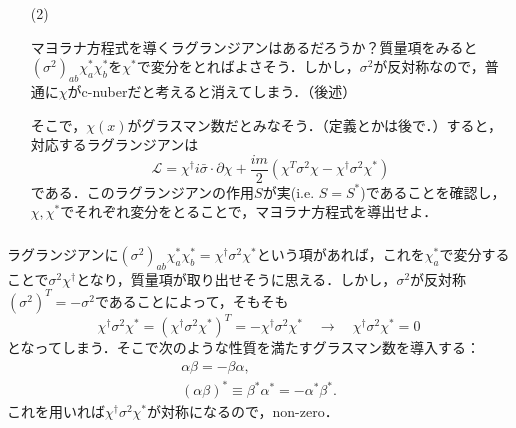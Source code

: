 \documentclass[pdflatex,unicode,ja=standard,12pt]{beamer}
\begin{document}
\begin{frame}

  \frametitle{\subsecname}

  \begin{itemize}

    \item [(2)]

    マヨラナ方程式を導くラグランジアンはあるだろうか？質量項をみると$(\sigma^2)_{ab}\chi^{*}_{a}\chi^{*}_{b}$を$\chi^{*}$で変分をとればよさそう．しかし，$\sigma^2$が反対称なので，普通に$\chi$がc-nuberだと考えると消えてしまう．（後述）

    \vspace{5pt}

    そこで，$\chi(x)$がグラスマン数だとみなそう．（定義とかは後で．）すると，対応するラグランジアンは
    \begin{equation}
      \mathcal{L}
      =
      \chi^{\dag}i\bar{\sigma}\cdot\partial\chi
      +
      \frac{im}{2}
      (  
        \chi^{T}\sigma^2\chi
        -
        \chi^{\dag}\sigma^2\chi^{*}
      )
      \label{majorana_lagrangian}
    \end{equation}
    である．このラグランジアンの作用$S$が実(i.e. $S=S^{*}$)であることを確認し，$\chi,\chi^{*}$でそれぞれ変分をとることで，マヨラナ方程式を導出せよ．
 
  \end{itemize}

\end{frame}

\begin{frame}
  
  \frametitle{\subsecname}

  ラグランジアンに$(\sigma^2)_{ab}\chi^{*}_a\chi^{*}_b=\chi^{\dag}\sigma^{2}\chi^{*}$という項があれば，これを$\chi^{*}_a$で変分することで$\sigma^{2}\chi^{\dag}$となり，質量項が取り出せそうに思える．しかし，$\sigma^{2}$が反対称$(\sigma^2)^{T}=-\sigma^2$であることによって，そもそも
  \begin{equation}
    \chi^{\dag}\sigma^{2}\chi^{*}
    =
    (\chi^{\dag}\sigma^{2}\chi^{*})^{T}
    =
    -\chi^{\dag}\sigma^{2}\chi^{*}
    \quad\rightarrow\quad
    \chi^{\dag}\sigma^{2}\chi^{*}=0
  \end{equation}
  となってしまう．そこで次のような性質を満たすグラスマン数を導入する：
  \begin{gather}
    \alpha \beta
    =
    -\beta \alpha
    ,
    \\
    (\alpha\beta)^{*}
    \equiv
    \beta^{*}\alpha^{*}
    =
    -\alpha^{*}\beta^{*}
    .
  \end{gather}
  これを用いれば$\chi^{\dag}\sigma^{2}\chi^{*}$が対称になるので，non-zero．

\end{frame}
\end{document}

